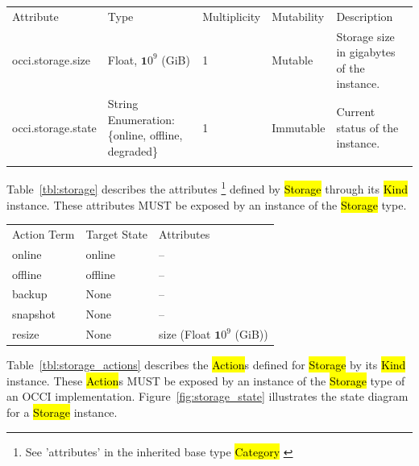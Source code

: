 \documentclass[10pt,a4paper]{article}
\begin{document}
{
	\begin{tabular}{lp{2.5cm}p{1cm}lp{6cm}}
	\toprule
	Attribute&Type&Multi\-plicity&Mutability&Description\\
	\colrule
	\hline
	occi.storage.size & Float, ${\mathbf 10}^9$ (GiB) & 1 & Mutable 
	& Storage size in gigabytes of the 	instance.\\
	occi.storage.state & String Enumeration: \{online, offline, degraded\} & 1 & Immutable 
	& Current status of the instance.\\
	\botrule
	\end{tabular}
}
Table~\ref{tbl:storage} describes the attributes \footnote{See ’attributes’ in the inherited 
base type \hl{Category}  \cite{occi:core}} 
defined by \hl{Storage} through its \hl{Kind} instance. These attributes
MUST be exposed by an instance of the \hl{Storage} type.

{
	\begin{tabular}{lll}
	\toprule
	Action Term&Target State&Attributes\\
	\colrule
	online & online & --\\
	offline & offline & --\\
	backup & None & --\\
	snapshot & None & --\\
	resize & None & size (Float  ${\mathbf 10}^9$ (GiB))
	\end{tabular}
}

Table~\ref{tbl:storage_actions} describes the \hl{Action}s defined for
\hl{Storage} by its \hl{Kind} instance. These \hl{Action}s MUST be exposed 
by an instance of the \hl{Storage} type of an OCCI implementation. 
Figure~\ref{fig:storage_state} illustrates the state diagram for a \hl{Storage} instance.
\end{document}
